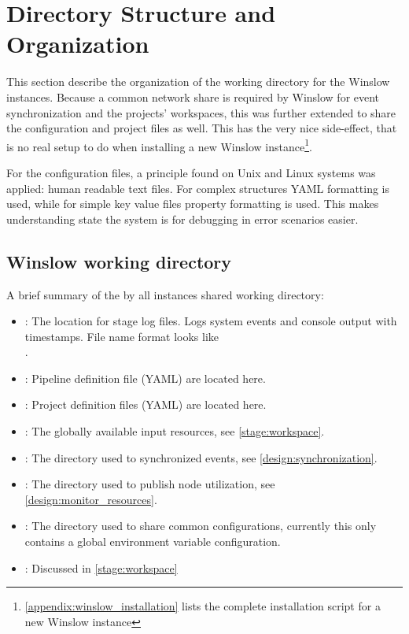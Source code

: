 \section{Directory Structure and Organization}

This section describe the organization of the working directory for the Winslow instances.
Because a common network share is required by Winslow for event synchronization and the projects' workspaces, this was further extended to share the configuration and project files as well.
This has the very nice side-effect, that is no real setup to do when installing a new Winslow instance\footnote{\autoref{appendix:winslow_installation} lists the complete installation script for a new Winslow instance}.

For the configuration files, a principle found on Unix and Linux systems was applied: human readable text files.
For complex structures YAML formatting is used, while for simple key value files property formatting is used.
This makes understanding state the system is for debugging in error scenarios easier.

\subsection{Winslow working directory}
\label{design:winslow:workdir}

A brief summary of the by all instances shared working directory:

\begin{itemize}
	\item {}: The location for stage log files. Logs system events and console output with timestamps. File name format looks like \\
	.
	\item {}: Pipeline definition file (YAML) are located here.
	\item {}: Project definition files (YAML) are located here.
	\item {}: The globally available input resources, see \autoref{stage:workspace}.
	\item {}: The directory used to synchronized events, see \autoref{design:synchronization}.
	\item {}: The directory used to publish node utilization, see \autoref{design:monitor_resources}.
	\item {}: The directory used to share common configurations, currently this only contains a global environment variable configuration.
	\item {}: Discussed in \autoref{stage:workspace}
\end{itemize}

